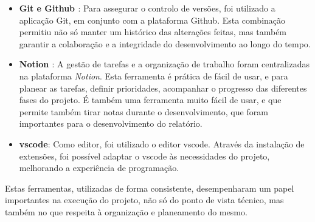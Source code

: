 \begin{itemize}
    \item \textbf{Git \cite{git} e Github \cite{github}}: Para assegurar o controlo de versões, foi utilizado a aplicação Git, em conjunto com a plataforma Github. Esta combinação permitiu não só manter um histórico  das alterações feitas, mas também garantir a colaboração e a integridade do desenvolvimento ao longo do tempo.

    \item \textbf{Notion \cite{notion}}: A gestão de tarefas e a organização de trabalho foram centralizadas na plataforma \textit{Notion}. Esta ferramenta é prática de fácil de usar, e para planear as tarefas, definir prioridades, acompanhar o progresso das diferentes fases do projeto. É também uma ferramenta muito fácil de usar, e que permite também tirar notas durante o desenvolvimento, que foram importantes para o desenvolvimento do relatório.

    \item \textbf{\gls{vscode}\cite{vscode}}: Como editor, foi utilizado o editor \gls{vscode}. Através da instalação de extensões, foi possível adaptar o \gls{vscode} às necessidades do projeto, melhorando a experiência de programação.
\end{itemize}

Estas ferramentas, utilizadas de forma consistente, desempenharam um papel importantes na execução do projeto, não só do ponto de vista técnico, mas também no que respeita à organização e planeamento do mesmo.
